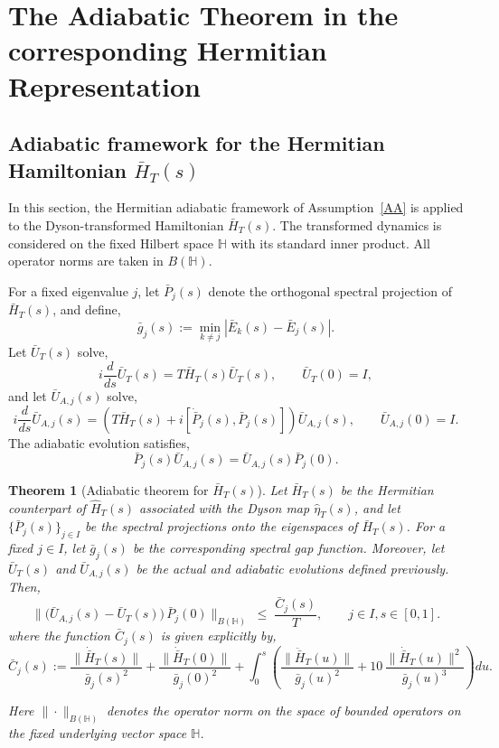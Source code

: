 \documentclass[pdflatex,sn-mathphys-num]{sn-jnl}
\theoremstyle{thmstyleone}
\newtheorem{theorem}{Theorem}
\theoremstyle{thmstyletwo}
\theoremstyle{thmstylethree}
\begin{document}
\section{The Adiabatic Theorem in the corresponding Hermitian Representation}
\subsection{Adiabatic framework for the Hermitian Hamiltonian $\bar H_T(s)$}

In this section, the Hermitian adiabatic framework of
Assumption~\ref{AA} is applied to the Dyson-transformed Hamiltonian
\(\bar H_T(s)\). The transformed dynamics is considered on the fixed Hilbert space
\(\mathbb H\) with its standard inner product. All operator norms are taken in
\(B(\mathbb H)\).

For a fixed eigenvalue \(j\), let \(\bar P_j(s)\) denote the orthogonal spectral
projection of \(\bar H_T(s)\), and define,
\begin{equation}
\bar g_j(s)
:=
\min_{k\neq j}|\bar E_k(s)-\bar E_j(s)|.
\end{equation}
Let \(\bar U_T(s)\) solve,
\begin{equation}
i\frac{d}{ds}\bar U_T(s)
=
T\bar H_T(s)\bar U_T(s),
\qquad
\bar U_T(0)=I,
\end{equation}
and let \(\bar U_{A,j}(s)\) solve,
\begin{equation}
i\frac{d}{ds}\bar U_{A,j}(s)
=
\left(
T\bar H_T(s)
+
i[\dot{\bar P}_j(s),\bar P_j(s)]
\right)\bar U_{A,j}(s),
\qquad
\bar U_{A,j}(0)=I.
\end{equation}
The adiabatic evolution satisfies,
\begin{equation}\label{3.1}
    \bar P_j(s)\bar U_{A,j}(s)
=
\bar U_{A,j}(s)\bar P_j(0).
\end{equation}

\begin{theorem}[Adiabatic theorem for $\bar H_T(s)$]\label{Thm:AdiabaticBar}
Let $\bar H_T(s)$ be the Hermitian counterpart of $\hat H_T(s)$ associated with the
Dyson map $\hat\eta_T(s)$, and let $\{\bar P_j(s)\}_{j\in I}$ be the spectral projections
onto the eigenspaces of $\bar H_T(s)$. For a fixed $j\in I$, let $\bar g_j(s)$ be the
corresponding spectral gap function. Moreover, let $\bar U_T(s)$ and $\bar U_{A,j}(s)$ be
the actual and adiabatic evolutions defined previously. Then,
\[
 \big\|
 \big( \bar U_{A,j}(s) - \bar U_T(s) \big)\,\bar P_j(0)
 \big\|_{B(\mathbb{H})}
 \;\le\;
 \frac{\bar C_j(s)}{T},\qquad j\in I, s\in[0,1].
\]
where the function $\bar C_j(s)$ is given explicitly by,
\[
 \bar C_j(s)
 :=
 \frac{\|\dot{\bar H}_T(s)\|}{\bar g_j(s)^2}
 +
 \frac{\|\dot{\bar H}_T(0)\|}{\bar g_j(0)^2}
 +
 \int_0^s
 \left(
   \frac{\|\ddot{\bar H}_T(u)\|}{\bar g_j(u)^2}
   +
   10\,\frac{\|\dot{\bar H}_T(u)\|^2}{\bar g_j(u)^3}
 \right) du .
\]

Here $\|\cdot\|_{B(\mathbb{H})}$ denotes the operator norm on the space of bounded
operators on the fixed underlying vector space $\mathbb{H}$.
\end{theorem}
\end{document}
